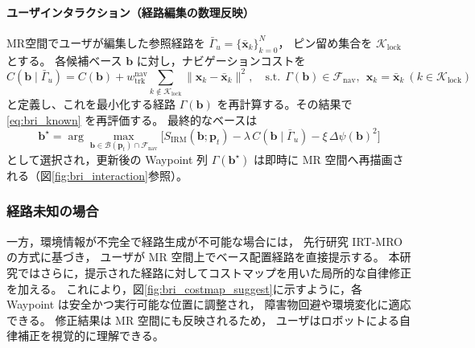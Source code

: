 \documentclass[../../main.tex]{subfiles} %
\begin{document}
\paragraph{ユーザインタラクション（経路編集の数理反映）}
MR空間でユーザが編集した参照経路を $\bar{\Gamma}_{u}=\{\bar{\mathbf{x}}_k\}_{k=0}^{N}$，
ピン留め集合を $\mathcal{K}_{\mathrm{lock}}$ とする。
各候補ベース $\mathbf{b}$ に対し，ナビゲーションコストを
\[
C(\mathbf{b}\mid \bar{\Gamma}_{u})
= C(\mathbf{b})
+ w_{\mathrm{trk}}^{\mathrm{nav}}\!\!\sum_{k\notin \mathcal{K}_{\mathrm{lock}}}\!\!\|\mathbf{x}_k-\bar{\mathbf{x}}_k\|^2,
\quad
\text{s.t.}\ \ \Gamma(\mathbf{b})\in\mathcal{F}_{\mathrm{nav}},\ \ \mathbf{x}_k=\bar{\mathbf{x}}_k\ (k\in\mathcal{K}_{\mathrm{lock}})
\]
と定義し、これを最小化する経路 $\Gamma(\mathbf{b})$ を再計算する。その結果で \eqref{eq:bri_known} を再評価する。
最終的なベースは
\[
\mathbf{b}^\star
=\arg\max_{\mathbf{b}\in\mathcal{B}(\mathbf{p}_t)\cap\mathcal{F}_{\mathrm{nav}}}
\Big[
S_{\mathrm{IRM}}(\mathbf{b};\mathbf{p}_t) - \lambda\,C(\mathbf{b}\mid\bar{\Gamma}_{u}) - \xi\,\Delta\psi(\mathbf{b})^2
\Big]
\]
として選択され，更新後の Waypoint 列 $\Gamma(\mathbf{b}^\star)$ は即時に MR 空間へ再描画される（図\ref{fig:bri_interaction}参照）。



\subsubsection{経路未知の場合}
一方，環境情報が不完全で経路生成が不可能な場合には，
先行研究 IRT-MRO \cite{Esaki} の方式に基づき，
ユーザが MR 空間上でベース配置経路を直接提示する。
本研究ではさらに，提示された経路に対してコストマップを用いた局所的な自律修正を加える。
これにより，図\ref{fig:bri_costmap_suggest}に示すように，各 Waypoint は安全かつ実行可能な位置に調整され，
障害物回避や環境変化に適応できる。
修正結果は MR 空間にも反映されるため，
ユーザはロボットによる自律補正を視覚的に理解できる。

\end{document}
